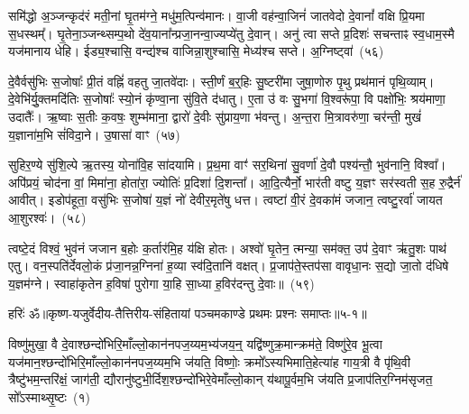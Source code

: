 समि॑द्धो अ॒ञ्जन्कृद॑रं मती॒नां घृ॒तम॑ग्ने॒ मधु॑म॒त्पिन्व॑मानः। वा॒जी वह॑न्वा॒जिनं॑ जातवेदो दे॒वानां᳚ वक्षि प्रि॒यमा स॒धस्थम्᳚। घृ॒तेना॒ञ्जन्थ्सम्प॒थो दे॑व॒याना᳚न्प्रजा॒नन्वा॒ज्यप्ये॑तु दे॒वान्। अनु॑ त्वा सप्ते प्र॒दिशः॑ सचन्ताꣴ स्व॒धाम॒स्मै यज॑मानाय धेहि। ईड्य॒श्चासि॒ वन्द्य॑श्च वाजिन्ना॒शुश्चासि॒ मेध्य॑श्च सप्ते। अ॒ग्निष्ट्वा॑~(५६)\ip

दे॒वैर्वसु॑भिः स॒जोषाः᳚ प्री॒तं वह्निं॑ वहतु जा॒तवे॑दाः। स्ती॒र्णं ब॒र्॒\mbox{}हिः सु॒ष्टरी॑मा जुषा॒णोरु पृ॒थु प्रथ॑मानं पृथि॒व्याम्। दे॒वेभि॑र्यु॒क्तमदि॑तिः स॒जोषाः᳚ स्यो॒नं कृ॑ण्वा॒ना सु॑वि॒ते द॑धातु। ए॒ता उ॑ वः सु॒भगा॑ वि॒श्वरू॑पा॒ वि पक्षो॑भिः॒ श्रय॑माणा॒ उदातैः᳚। ऋ॒ष्वाः स॒तीः क॒वषः॒ शुम्भ॑माना॒ द्वारो॑ दे॒वीः सु॑प्राय॒णा भ॑वन्तु। अ॒न्त॒रा मि॒त्रावरु॑णा॒ चर॑न्ती॒ मुखं॑ य॒ज्ञाना॑म॒भि सं॑विदा॒ने। उ॒षासा॑ वाꣳ~(५७)\ip

सुहिर॒ण्ये सु॑शि॒ल्पे ऋ॒तस्य॒ योना॑वि॒ह सा॑दयामि। प्र॒थ॒मा वाꣳ॑ सर॒थिना॑ सु॒वर्णा॑ दे॒वौ पश्य॑न्तौ॒ भुव॑नानि॒ विश्वा᳚। अपि॑प्रयं॒ चोद॑ना वां॒ मिमा॑ना॒ होता॑रा॒ ज्योतिः॑ प्र॒दिशा॑ दि॒शन्ता᳚। आ॒दि॒त्यैर्नो॒ भार॑ती वष्टु य॒ज्ञꣳ सर॑स्वती स॒ह रु॒द्रैर्न॑ आवीत्। इडोप॑हूता॒ वसु॑भिः स॒जोषा॑ य॒ज्ञं नो॑ देवीर॒मृते॑षु धत्त। त्वष्टा॑ वी॒रं दे॒वका॑मं जजान॒ त्वष्टु॒रर्वा॑ जायत आ॒शुरश्वः॑।~(५८)\ip

त्वष्टे॒दं विश्वं॒ भुव॑नं जजान ब॒होः क॒र्तार॑मि॒ह य॑क्षि होतः। अश्वो॑ घृ॒तेन॒ त्मन्या॒ सम॑क्त॒ उप॑ दे॒वाꣳ ऋ॑तु॒शः पाथ॑ एतु। वन॒स्पति॑र्देवलो॒कं प्र॑जा॒नन्न॒ग्निना॑ ह॒व्या स्व॑दि॒तानि॑ वक्षत्। प्र॒जा\-प॑ते॒स्तप॑सा वावृधा॒नः स॒द्यो जा॒तो द॑धिषे य॒ज्ञम॑ग्ने। स्वाहा॑कृतेन ह॒विषा॑ पुरोगा या॒हि सा॒ध्या ह॒विर॑दन्तु दे॒वाः॥~(५९)\ip

{\anuvakamend[{अ॒ग्निष्ट्वा॑ वा॒मश्वो॒ द्विच॑त्वारिꣳशच्च}]}%

{हरिः॑ ॐ}{॥कृष्ण-यजुर्वेदीय-तैत्तिरीय-संहितायां पञ्चमकाण्डे प्रथमः प्रश्नः समाप्तः॥५-१॥}



\setcounter{anuvakam}{0}
विष्णु॑मुखा॒ वै दे॒वाश्छन्दो॑भिरि॒माँल्लो॒कान॑नपज॒य्यम॒भ्य॑जय॒न्॒ यद्वि॑ष्णुक्र॒मान्क्रम॑ते॒ विष्णु॑रे॒व भू॒त्वा यज॑मान॒श्छन्दो॑भिरि॒माँल्लो॒कान॑नपज॒य्यम॒भि ज॑यति॒ विष्णोः॒ क्रमो᳚\-ऽस्यभिमाति॒हेत्या॑ह गाय॒त्री वै पृ॑थि॒वी त्रैष्टु॑भम॒न्तरि॑क्षं॒ जाग॑ती॒ द्यौरानु॑ष्टुभी॒र्दिश॒श्छन्दो॑भि\-रे॒वेमाँल्लो॒कान् य॑थापू॒र्वम॒भि ज॑यति प्र॒जा\-प॑तिर॒ग्निम॑सृजत॒ सो᳚\-ऽस्माथ्सृ॒ष्टः~(१)\ip


